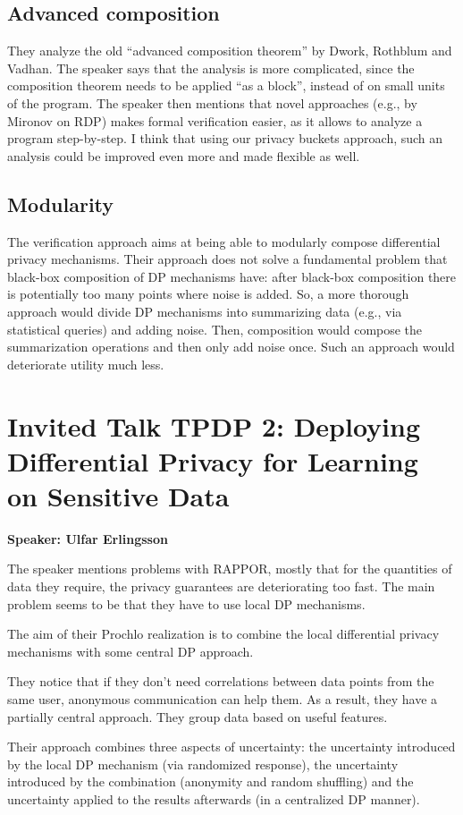 \documentclass{article}
\begin{document}
\subsection{Advanced composition}
They analyze the old ``advanced composition theorem'' by Dwork, Rothblum and Vadhan. The speaker says that the analysis is more complicated, since the composition theorem needs to be applied ``as a block'', instead of on small units of the program. The speaker then mentions that novel approaches (e.g., by Mironov on RDP) makes formal verification easier, as it allows to analyze a program step-by-step.
I think that using our privacy buckets approach, such an analysis could be improved even more and made flexible as well.

\subsection{Modularity}
The verification approach aims at being able to modularly compose differential privacy mechanisms. Their approach does not solve a fundamental problem that black-box composition of DP mechanisms have: after black-box composition there is potentially too many points where noise is added. So, a more thorough approach would divide DP mechanisms into summarizing data (e.g., via statistical queries) and adding noise. Then, composition would compose the summarization operations and then only add noise once. Such an approach would deteriorate utility much less.


\section{Invited Talk TPDP 2: Deploying Differential Privacy for Learning on Sensitive Data}
\noindent\textbf{Speaker: Ulfar Erlingsson}

The speaker mentions problems with RAPPOR, mostly that for the quantities of data they require, the privacy guarantees are deteriorating too fast. The main problem seems to be that they have to use local DP mechanisms. 

The aim of their Prochlo realization is to combine the local differential privacy mechanisms with some central DP approach.

They notice that if they don’t need correlations between data points from the same user, anonymous communication can help them. As a result, they have a partially central approach. They group data based on useful features.

Their approach combines three aspects of uncertainty: the uncertainty introduced by the local DP mechanism (via randomized response), the uncertainty introduced by the combination (anonymity and random shuffling) and the uncertainty applied to the results afterwards (in a centralized DP manner). 
\end{document}
